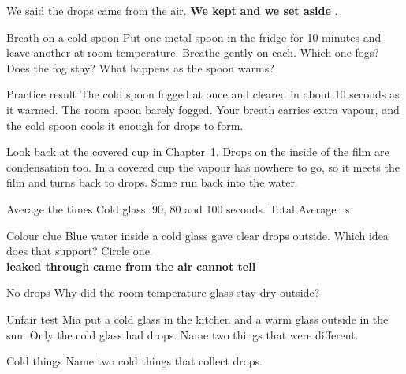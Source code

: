 \begin{keepbox}
We said the drops came from the air. \textbf{We kept} \wline[3.4cm] \textbf{and we set aside} \wline[3.4cm].
\end{keepbox}

\begin{tryit}{Breath on a cold spoon}
Put one metal spoon in the fridge for 10 minutes and leave another at room temperature. Breathe gently on each. Which one fogs? \wline[5cm]\\[4pt]
Does the fog stay? What happens as the spoon warms? \wline[5cm]
\end{tryit}

\begin{worked}{Practice result}
The cold spoon fogged at once and cleared in about 10 seconds as it warmed. The room spoon barely fogged. Your breath carries extra vapour, and the cold spoon cools it enough for drops to form.
\end{worked}

Look back at the covered cup in Chapter~1. Drops on the inside of the film are condensation too. In a covered cup the vapour has nowhere to go, so it meets the film and turns back to drops. Some run back into the water.

\clearpage

\begin{puzzle}{Average the times}
Cold glass: 90, 80 and 100 seconds. Total \wline[1.6cm] Average \wline[1.6cm]~s
\end{puzzle}

\begin{puzzle}{Colour clue}
Blue water inside a cold glass gave clear drops outside. Which idea does that support? Circle one. \\
\textbf{leaked through} \quad \textbf{came from the air} \quad \textbf{cannot tell}
\end{puzzle}

\begin{puzzle}{No drops}
Why did the room-temperature glass stay dry outside? \wline[6cm]
\end{puzzle}

\begin{puzzle}{Unfair test}
Mia put a cold glass in the kitchen and a warm glass outside in the sun. Only the cold glass had drops. Name two things that were different. \wline[6cm]
\end{puzzle}

\begin{puzzle}{Cold things}
Name two cold things that collect drops. \wline[5cm]
\end{puzzle}

